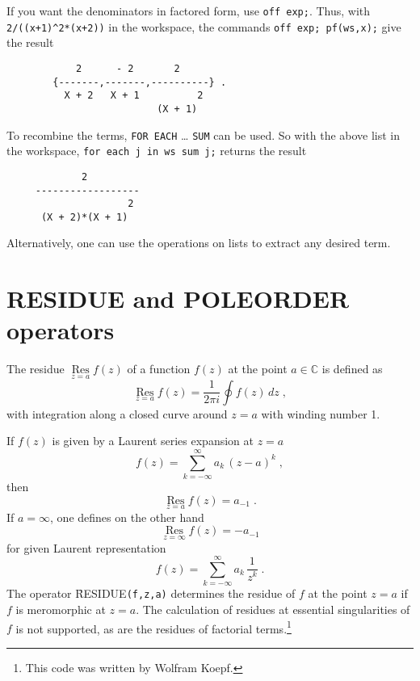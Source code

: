 If you want the denominators in factored form, use \texttt{off exp;}.
Thus, with \texttt{2/((x+1)\textasciicircum2*(x+2))} in the workspace,
the commands \texttt{off exp; pf(ws,x);} give the result
\begin{verbatim}
            2      - 2       2
        {-------,-------,----------} .
          X + 2   X + 1          2
                          (X + 1)
\end{verbatim}

To recombine the terms, \texttt{FOR EACH} \ldots{} \texttt{SUM} can be used.
So with the above list in the workspace,
\texttt{for each j in ws sum j;} returns the result
\begin{verbatim}
             2
     ------------------
                     2
      (X + 2)*(X + 1)
\end{verbatim}

Alternatively, one can use the operations on lists to extract any desired
term.


\section{RESIDUE and POLEORDER operators}
\hypertarget{operator:RESIDUE}{}
\hypertarget{operator:POLEORDER}{}

The residue
$\mathop{\mathrm{Res}}\limits_{z=a} f(z)$ of a function $f(z)$ at the point $a\in\mathbb{C}$ is defined
as
\[
\mathop{\mathrm{Res}}\limits_{z=a} f(z)=
\frac{1}{2 \pi i}\oint f(z)\,dz
\;,
\]
with integration along a closed curve around $z=a$ with winding number 1.

If $f(z)$ is given by a Laurent series expansion at $z=a$
\[
f(z)=\sum_{k=-\infty}^\infty a_k\,(z-a)^k
\;,
\]
then
\begin{equation}
\mathop{\mathrm{Res}}\limits_{z=a} f(z)=a_{-1}
\;.
\label{eq:Laurent}
\end{equation}
If $a=\infty$, one defines on the other hand
\begin{equation}
\mathop{\mathrm{Res}}\limits_{z=\infty} f(z)=-a_{-1}
\label{eq:Laurent2}
\end{equation}
for given Laurent representation
\[
f(z)=\sum_{k=-\infty}^\infty a_k\,\frac{1}{z^k}
\;.
\]
The operator \f{RESIDUE}\texttt{(f,z,a)} determines the residue of $f$ at the point $z=a$
if $f$ is meromorphic at $z=a$. The calculation of residues at essential
singularities of $f$ is not supported, as are the residues of factorial terms.\footnote{This code was written by Wolfram Koepf.}


